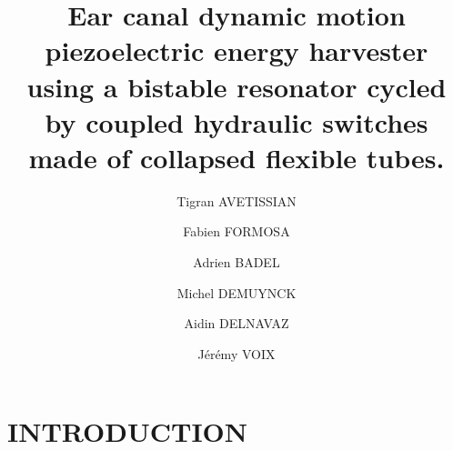 \documentclass[3p,twocolumn,preprint]{elsarticle}
\begin{document}
\tableofcontents

\begin{frontmatter}



\title{Ear canal dynamic motion piezoelectric energy harvester using a bistable resonator cycled by coupled hydraulic switches made of collapsed flexible tubes.}



\address[symme]{Laboratoire SYMME - Université Savoie Mont Blanc, 7 Chemin de Bellevue, 74940, Annecy}
\address[critias]{Laboratoire Critias - École de Technologie Supérieure, 1100 Rue Notre-Dame Ouest, Montréal, QC, H3C 1K3}


\author[symme]{Tigran AVETISSIAN}
\author[symme]{Fabien FORMOSA}
\author[symme]{Adrien BADEL}

\author[critias]{Michel DEMUYNCK}
\author[critias]{Aidin DELNAVAZ}
\author[critias]{Jérémy VOIX}


\begin{abstract}
\end{abstract}

\begin{keyword}
\end{keyword}

\end{frontmatter}


\section{INTRODUCTION}
\label{INTRODUCTION} %
\end{document}
